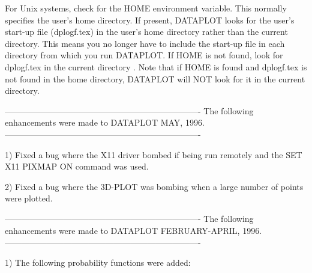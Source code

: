 { For Unix systems, check for the HOME environment variable.  This
 normally specifies the user's home directory.  If present, DATAPLOT
 looks for the user's start-up file (dplogf.tex) in the user's home
 directory rather than the current directory.  This means you no
 longer have to include the start-up file in each directory from
 which you run DATAPLOT.  If HOME is not found, look for dplogf.tex
 in the current directory .  Note that if HOME is found and dplogf.tex
 is not found in the home directory, DATAPLOT will NOT look for
 it in the current directory.

----------------------------------------------------------------------
The following enhancements were made to DATAPLOT MAY,            1996.
----------------------------------------------------------------------

 1) Fixed a bug where the X11 driver bombed if being run remotely
    and the SET X11 PIXMAP ON command was used.

 2) Fixed a bug where the 3D-PLOT was bombing when a large number of
    points were plotted.

----------------------------------------------------------------------
The following enhancements were made to DATAPLOT FEBRUARY-APRIL, 1996.
----------------------------------------------------------------------

 1) The following probability functions were added:

}
